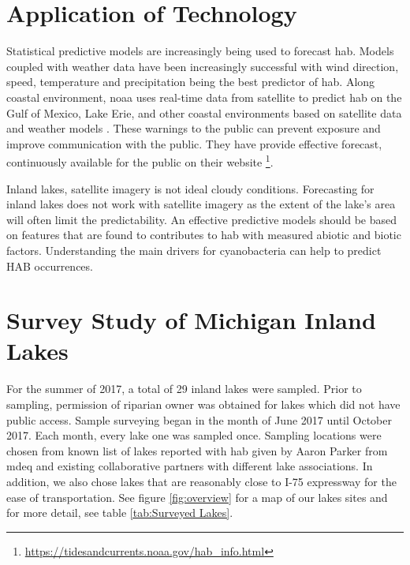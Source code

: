 \section{Application of Technology}
Statistical predictive models are increasingly being used to forecast \gls{hab}. Models coupled with weather data have been increasingly successful with wind direction, speed, temperature and precipitation being the best predictor of \gls{hab}. Along coastal environment,   \gls{noaa} uses real-time data from satellite to predict \gls{hab} on the Gulf of Mexico, Lake Erie, and other coastal environments based on satellite data and weather models \cite{kavanaugh_assessment_2013}. These warnings to the public can prevent exposure and improve communication with the public. They have provide effective forecast, continuously available for the public on their website \footnote{\url{https://tidesandcurrents.noaa.gov/hab_info.html}}. %

Inland lakes, satellite imagery is not ideal cloudy conditions. Forecasting for inland lakes does not work with satellite imagery as the extent of the lake's area will often limit the predictability. An effective predictive models should be based on features that are found to contributes to \gls{hab} with measured abiotic and biotic factors. Understanding the main drivers for cyanobacteria can help to predict HAB occurrences.

\section{Survey Study of Michigan Inland Lakes} 
For the summer of 2017, a total of 29 inland lakes were sampled. Prior to sampling, permission of riparian owner was obtained for lakes which did not have public access. Sample surveying began in the month of June 2017 until October 2017. Each month, every lake one was sampled once. Sampling locations were chosen from known list of lakes reported with \gls{hab} given by Aaron Parker from \gls{mdeq} and existing collaborative partners with different lake associations. In addition, we also chose lakes that are reasonably close to I-75 expressway for the ease of transportation. See figure \ref{fig:overview} for a map of our lakes sites and for more detail, see table \ref{tab:Surveyed Lakes}.

